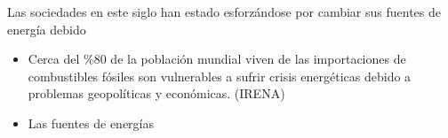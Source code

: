 Las sociedades en este siglo han estado esforzándose por cambiar sus fuentes
de energía debido

\begin{itemize}
    \item Cerca del \%80 de la población mundial viven de las importaciones 
     de combustibles fósiles son vulnerables a sufrir crisis energéticas
     debido a problemas geopolíticas y económicas.
     (IRENA)
    
    \item Las fuentes de energías
\end{itemize}
